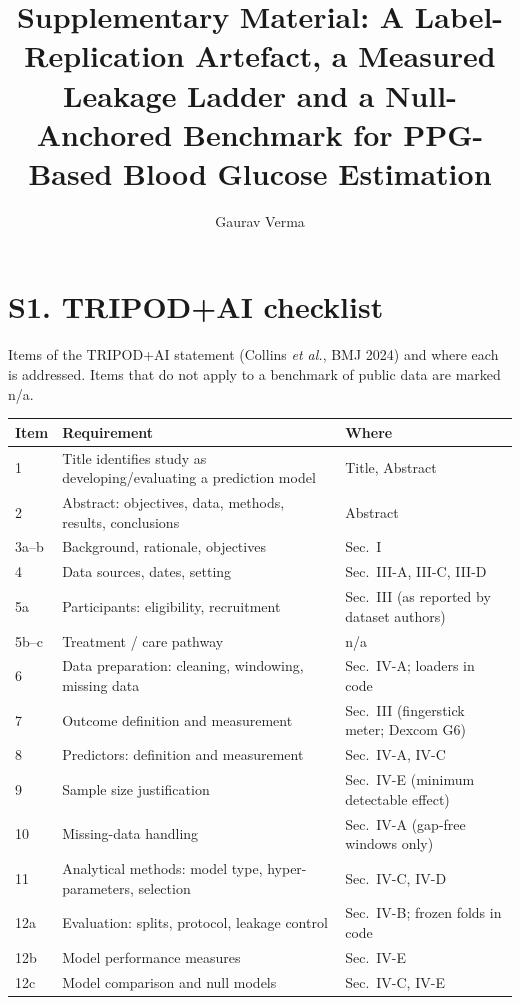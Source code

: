 \documentclass[journal,onecolumn]{IEEEtran}
\begin{document}
\title{Supplementary Material: A Label-Replication Artefact, a Measured
Leakage Ladder and a Null-Anchored Benchmark for PPG-Based Blood Glucose
Estimation}
\author{Gaurav Verma}
\maketitle

\section*{S1. TRIPOD+AI checklist}
Items of the TRIPOD+AI statement (Collins \emph{et al.}, BMJ 2024) and where
each is addressed.  Items that do not apply to a benchmark of public data
are marked n/a.

\begin{longtable}{@{}p{0.9cm}p{4.6cm}p{2.6cm}@{}}
\toprule
\textbf{Item} & \textbf{Requirement} & \textbf{Where} \\
\midrule
1 & Title identifies study as developing/evaluating a prediction model & Title, Abstract \\
2 & Abstract: objectives, data, methods, results, conclusions & Abstract \\
3a--b & Background, rationale, objectives & Sec.~I \\
4 & Data sources, dates, setting & Sec.~III-A, III-C, III-D \\
5a & Participants: eligibility, recruitment & Sec.~III (as reported by dataset authors) \\
5b--c & Treatment / care pathway & n/a \\
6 & Data preparation: cleaning, windowing, missing data & Sec.~IV-A; loaders in code \\
7 & Outcome definition and measurement & Sec.~III (fingerstick meter; Dexcom G6) \\
8 & Predictors: definition and measurement & Sec.~IV-A, IV-C \\
9 & Sample size justification & Sec.~IV-E (minimum detectable effect) \\
10 & Missing-data handling & Sec.~IV-A (gap-free windows only) \\
11 & Analytical methods: model type, hyper-parameters, selection & Sec.~IV-C, IV-D \\
12a & Evaluation: splits, protocol, leakage control & Sec.~IV-B; frozen folds in code \\
12b & Model performance measures & Sec.~IV-E \\
12c & Model comparison and null models & Sec.~IV-C, IV-E \\

\end{longtable}
\end{document}
